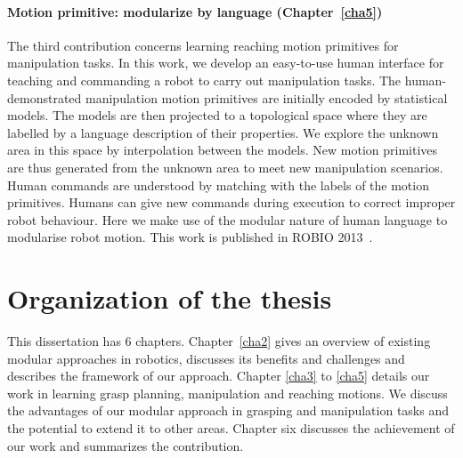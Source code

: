 \paragraph{Motion primitive: modularize by language (Chapter~\ref{cha5})}
The third contribution concerns learning reaching motion primitives for manipulation tasks. In this work, we develop an easy-to-use human interface for teaching and commanding a robot to carry out manipulation tasks. The human-demonstrated manipulation motion primitives are initially encoded by statistical models. The models are then projected to a topological space where they are labelled by a language description of their properties. We explore the unknown area in this space by interpolation between the models. New motion primitives are thus generated from the unknown area to meet new manipulation scenarios.
Human commands are understood by matching with the labels of the motion primitives. Humans can give new commands during execution to correct improper robot behaviour. Here we make use of the modular nature of human language to modularise robot motion. This work is published in ROBIO 2013~\citep{bidan2013robio}.






\section{Organization of the thesis}
\label{cha1:organization}
This dissertation has 6 chapters. Chapter~\ref{cha2} gives an overview of existing modular approaches in robotics, discusses its benefits and challenges and describes the framework of our approach. Chapter \ref{cha3} to \ref{cha5} details our work in learning grasp planning, manipulation and reaching motions. We discuss the advantages of our modular approach in grasping and manipulation tasks and the potential to extend it to other areas. Chapter six discusses the achievement of our work and summarizes the contribution.

